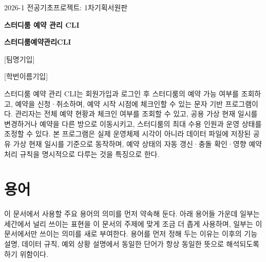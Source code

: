 \documentclass[a4paper,10pt]{article}
\newcommand{\teamname}{[팀명기입]}
\newcommand{\projecttitle}{스터디룸예약관리CLI}
\begin{document}
\thispagestyle{empty}

{\small 2026-1 전공기초프로젝트: 1차기획서원판}

\vspace{2.2cm}

\begin{center}
{\LARGE\bfseries 스터디룸 예약 관리 CLI\par}
\vspace{0.8cm}
{\Large\bfseries \projecttitle\par}
\vspace{1.0cm}
{\large \teamname\par}
\vspace{0.5cm}
{\normalsize
[학번이름기입]\par
[학번이름기입]\par
[학번이름기입]\par
[학번이름기입]\par}
\end{center}

\vspace{1.4cm}

\begin{center}
\end{center}

\vspace{-1.2cm}

스터디룸 예약 관리 CLI는 회원가입과 로그인 후 스터디룸의 예약 가능 여부를 조회하고, 예약을 신청·취소하며, 예약 시작 시점에 체크인할 수 있는 문자 기반 프로그램이다. 관리자는 전체 예약 현황과 체크인 여부를 조회할 수 있고, 공용 가상 현재 일시를 변경하거나 예약을 다른 방으로 이동시키고, 스터디룸의 최대 수용 인원과 운영 상태를 조정할 수 있다. 본 프로그램은 실제 운영체제 시각이 아니라 데이터 파일에 저장된 공유 가상 현재 일시를 기준으로 동작하며, 예약 상태의 자동 갱신·충돌 확인·영향 예약 처리 규칙을 명시적으로 다루는 것을 특징으로 한다.

\vspace{0.6cm}
\tableofcontents
\thispagestyle{empty}
\newpage

\section{용어}
이 문서에서 사용할 주요 용어의 의미를 먼저 약속해 둔다. 아래 용어들 가운데 일부는 세간에서 널리 쓰이는 표현을 이 문서의 주제에 맞게 조금 더 좁게 사용하며, 일부는 이 문서에서만 쓰이는 의미를 새로 부여한다. 용어를 먼저 정해 두는 이유는 이후의 기능 설명, 데이터 규칙, 예외 상황 설명에서 동일한 단어가 항상 동일한 뜻으로 해석되도록 하기 위함이다.
\end{document}
